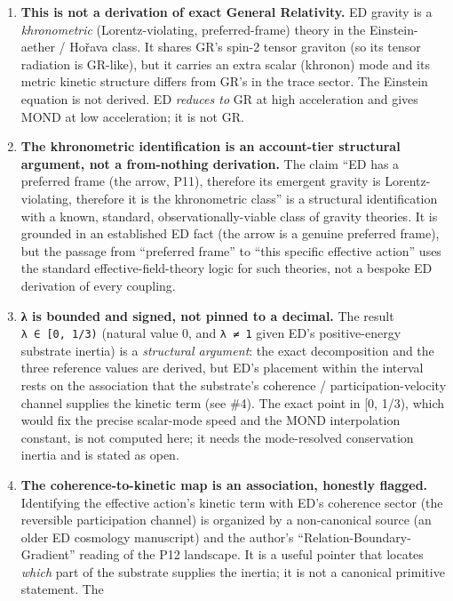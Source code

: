 \documentclass[
]{article}
\begin{document}
\begin{enumerate}
\def\labelenumi{\arabic{enumi}.}
\item
  \textbf{This is not a derivation of exact General Relativity.} ED
  gravity is a \emph{khronometric} (Lorentz-violating, preferred-frame)
  theory in the Einstein-aether / Hořava class. It shares GR's spin-2
  tensor graviton (so its tensor radiation is GR-like), but it carries
  an extra scalar (khronon) mode and its metric kinetic structure
  differs from GR's in the trace sector. The Einstein equation is not
  derived. ED \emph{reduces to} GR at high acceleration and gives MOND
  at low acceleration; it is not GR.
\item
  \textbf{The khronometric identification is an account-tier structural
  argument, not a from-nothing derivation.} The claim ``ED has a
  preferred frame (the arrow, P11), therefore its emergent gravity is
  Lorentz-violating, therefore it is the khronometric class'' is a
  structural identification with a known, standard,
  observationally-viable class of gravity theories. It is grounded in an
  established ED fact (the arrow is a genuine preferred frame), but the
  passage from ``preferred frame'' to ``this specific effective action''
  uses the standard effective-field-theory logic for such theories, not
  a bespoke ED derivation of every coupling.
\item
  \textbf{λ is bounded and signed, not pinned to a decimal.} The result
  \texttt{λ\ ∈\ {[}0,\ 1/3)} (natural value 0, and \texttt{λ\ ≠\ 1}
  given ED's positive-energy substrate inertia) is a \emph{structural
  argument}: the exact decomposition and the three reference values are
  derived, but ED's placement within the interval rests on the
  association that the substrate's coherence / participation-velocity
  channel supplies the kinetic term (see \#4). The exact point in {[}0,
  1/3), which would fix the precise scalar-mode speed and the MOND
  interpolation constant, is not computed here; it needs the
  mode-resolved conservation inertia and is stated as open.
\item
  \textbf{The coherence-to-kinetic map is an association, honestly
  flagged.} Identifying the effective action's kinetic term with ED's
  coherence sector (the reversible participation channel) is organized
  by a non-canonical source (an older ED cosmology manuscript) and the
  author's ``Relation-Boundary-Gradient'' reading of the P12 landscape.
  It is a useful pointer that locates \emph{which} part of the substrate
  supplies the inertia; it is not a canonical primitive statement. The

\end{enumerate}
\end{document}
